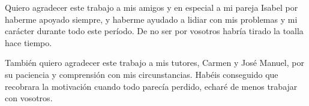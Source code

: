 
\pagestyle{fancy}



Quiero agradecer este trabajo a mis amigos y en especial a mi pareja Isabel por haberme apoyado siempre, y haberme ayudado a lidiar con mis problemas y mi carácter durante todo este período. De no ser por vosotros habría tirado la toalla hace tiempo.

También quiero agradecer este trabajo a mis tutores, Carmen y José Manuel, por su paciencia y comprensión con mis circunstancias. Habéis conseguido que recobrara la motivación cuando todo parecía perdido, echaré de menos trabajar con vosotros.

\chapterend


\blankpage
